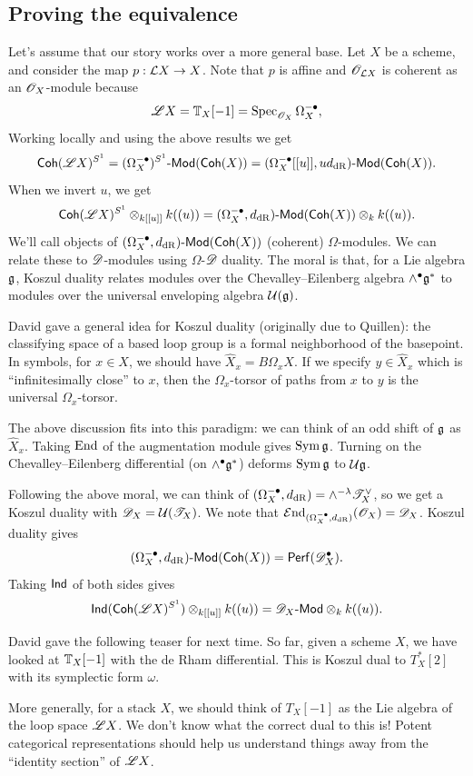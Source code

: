 \documentclass{article}
\begin{document}
\subsection{Proving the equivalence}

Let's assume that our story works over a more general base.
Let $X$ be a scheme, and consider the map $p: \mathcal{L} X \to X$.
Note that $p$ is affine and $\mathscr{O}_{\mathcal{L} X}$ is coherent as an $\mathscr{O}_X$-module because
\[
  \mathscr{L} X = \mathbb{T}_X[-1] = \operatorname{Spec}_{\mathscr{O}_X} \Omega_X^{-\bullet},
\]
Working locally and using the above results we get
\[
  \mathsf{Coh}(\mathscr{L} X)^{S^1} = (\Omega_X^{-\bullet})^{S^1}\text{-}\mathsf{Mod}(\mathsf{Coh}(X)) = (\Omega_X^{-\bullet}[[u]], u d_{\mathrm{dR}})\text{-}\mathsf{Mod}(\mathsf{Coh}(X)).
\]
When we invert $u$, we get
\[
  \mathsf{Coh}(\mathscr{L} X)^{S^1} \otimes_{k[[u]]} k((u)) = (\Omega_X^{-\bullet}, d_{\mathrm{dR}})\text{-}\mathsf{Mod}(\mathsf{Coh}(X)) \otimes_k k((u)).
\]
We'll call objects of $(\Omega_X^{-\bullet}, d_{\mathrm{dR}})\text{-}\mathsf{Mod}(\mathsf{Coh}(X))$ (coherent) $\Omega$-modules.
We can relate these to $\mathscr{D}$-modules using $\Omega$-$\mathscr{D}$ duality.
The moral is that, for a Lie algebra $\mathfrak{g}$, Koszul duality relates modules over the Chevalley--Eilenberg algebra $\wedge^\bullet \mathfrak{g}^*$ to modules over the universal enveloping algebra $\mathcal{U}(\mathfrak{g})$.

\begin{rmk}
  David gave a general idea for Koszul duality (originally due to Quillen): the classifying space of a based loop group is a formal neighborhood of the basepoint.
  In symbols, for $x \in X$, we should have $\hat{X}_x = B \Omega_x X$.
  If we specify $y \in \hat{X}_x$ which is ``infinitesimally close'' to $x$, then the $\Omega_x$-torsor of paths from $x$ to $y$ is the universal $\Omega_x$-torsor.

  The above discussion fits into this paradigm: we can think of an odd shift of $\mathfrak{g}$ as $\hat{X}_x$.
  Taking $\operatorname{End}$ of the augmentation module gives $\operatorname{Sym} \mathfrak{g}$.
  Turning on the Chevalley--Eilenberg differential (on $\wedge^\bullet \mathfrak{g}^*$) deforms $\operatorname{Sym} \mathfrak{g}$ to $\mathcal{U} \mathfrak{g}$.
\end{rmk}

Following the above moral, we can think of $(\Omega^{-\bullet}_X, d_{\mathrm{dR}}) = \wedge^{-\lambda} \mathscr{T}_X^\vee$, so we get a Koszul duality with $\mathscr{D}_X = \mathcal{U}(\mathscr{T}_X)$.
We note that $\mathcal{E}\mkern-3mu\operatorname{nd}_{(\Omega_X^{-\bullet}, d_{\mathrm{dR}})}(\mathscr{O}_X) = \mathscr{D}_X$.
Koszul duality gives 
\[
  (\Omega_X^{-\bullet}, d_{\mathrm{dR}})\text{-}\mathsf{Mod}(\mathsf{Coh}(X)) = \mathsf{Perf}(\mathscr{D}_X^\bullet).
\]
Taking $\operatorname{\mathsf{Ind}}$ of both sides gives
\[
  \operatorname{\mathsf{Ind}}(\mathsf{Coh}(\mathscr{L} X)^{S^1}) \otimes_{k[[u]]} k((u)) = \mathscr{D}_X\text{-}\mathsf{Mod} \otimes_k k((u)).
\]

\begin{rmk}
  David gave the following teaser for next time.
  So far, given a scheme $X$, we have looked at $\mathbb{T}_X[-1]$ with the de Rham differential.
  This is Koszul dual to $T^*_X[2]$ with its symplectic form $\omega$.

  More generally, for a stack $X$, we should think of $T_X[-1]$ as the Lie algebra of the loop space $\mathscr{L} X$.
  We don't know what the correct dual to this is!
  Potent categorical representations should help us understand things away from the ``identity section'' of $\mathscr{L} X$.
\end{rmk}
\end{document}
